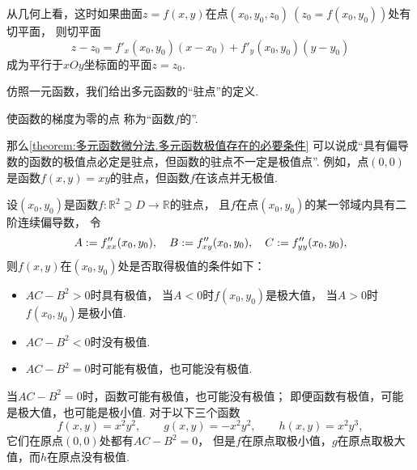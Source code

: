 从几何上看，这时如果曲面\(z=f(x,y)\)在点\((x_0,y_0,z_0)\ (z_0=f(x_0,y_0))\)处有切平面，
则切平面\[
	z-z_0=f'_x(x_0,y_0)(x-x_0)+f'_y(x_0,y_0)(y-y_0)
\]成为平行于\(xOy\)坐标面的平面\(z=z_0\).

仿照一元函数，我们给出多元函数的“驻点”的定义.
\begin{definition}
使函数的梯度为零的点
称为“函数\(f\)的”.
\end{definition}
那么\cref{theorem:多元函数微分法.多元函数极值存在的必要条件}
可以说成“具有偏导数的函数的极值点必定是驻点，但函数的驻点不一定是极值点”.
例如，点\((0,0)\)是函数\(f(x,y) = xy\)的驻点，但函数\(f\)在该点并无极值.

\begin{theorem}[充分条件]\label{theorem:多元函数微分法.多元函数极值存在的充分条件}
设\((x_0,y_0)\)是函数\(f\colon \mathbb{R}^2 \supseteq D \to \mathbb{R}\)的驻点，
且\(f\)在点\((x_0,y_0)\)的某一邻域内具有二阶连续偏导数，
令\[
	A := f''_{xx}(x_0,y_0),
	\quad
	B := f''_{xy}(x_0,y_0),
	\quad
	C := f''_{yy}(x_0,y_0),
\]
则\(f(x,y)\)在\((x_0,y_0)\)处是否取得极值的条件如下：
\begin{itemize}
	\item \(AC-B^2>0\)时具有极值，
	当\(A<0\)时\(f(x_0,y_0)\)是极大值，
	当\(A>0\)时\(f(x_0,y_0)\)是极小值.
	\item \(AC-B^2<0\)时没有极值.
	\item \(AC-B^2=0\)时可能有极值，也可能没有极值.
\end{itemize}
\end{theorem}

\begin{example}
当\(AC-B^2=0\)时，函数可能有极值，也可能没有极值；
即便函数有极值，可能是极大值，也可能是极小值.
对于以下三个函数\[
	f(x,y) = x^2 y^2,
	\qquad
	g(x,y) = -x^2 y^2,
	\qquad
	h(x,y) = x^2 y^3,
\]
它们在原点\((0,0)\)处都有\(AC-B^2=0\)，
但是\(f\)在原点取极小值，\(g\)在原点取极大值，而\(h\)在原点没有极值.
\end{example}

